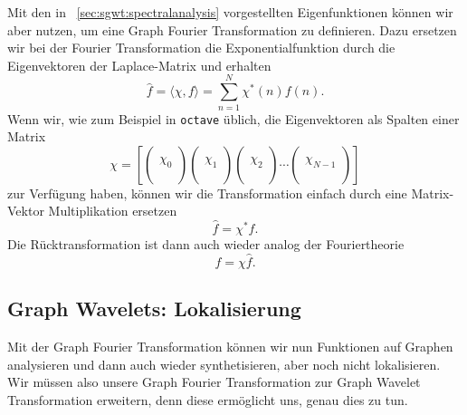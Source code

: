 Mit den in ~\cref{sec:sgwt:spectralanalysis} vorgestellten Eigenfunktionen 
k\"onnen wir aber nutzen, um eine Graph Fourier Transformation zu definieren. 
Dazu ersetzen wir bei der Fourier Transformation die Exponentialfunktion durch 
die Eigenvektoren der Laplace-Matrix und erhalten
\begin{equation*}
\hat{f} = \langle \chi, f \rangle = \sum_{n = 1}^{N} \chi^*(n)f(n).
\end{equation*}
Wenn wir, wie zum Beispiel in \texttt{octave} \"ublich, die Eigenvektoren als 
Spalten einer Matrix
\begin{equation}
\chi = 
\left[
\begin{pmatrix}\\\chi_0\\\\\end{pmatrix}
\begin{pmatrix}\\\chi_1\\\\\end{pmatrix}
\begin{pmatrix}\\\chi_2\\\\\end{pmatrix}
\cdots
\begin{pmatrix}\\\chi_{N-1}\\\\\end{pmatrix}
\right]
\end{equation}
zur Verf\"ugung haben, k\"onnen wir die Transformation 
einfach durch eine Matrix-Vektor Multiplikation ersetzen
\begin{equation*}
\hat{f} = \chi^* f.
\end{equation*}
Die R\"ucktransformation ist dann auch wieder analog der Fouriertheorie
\begin{equation*}
f = \chi \hat{f}.
\end{equation*}

\subsection{Graph Wavelets: Lokalisierung\label{subsec:sgwt:gwt:localizing}}

Mit der Graph Fourier Transformation k\"onnen wir nun Funktionen auf Graphen 
analysieren und dann auch wieder synthetisieren, aber noch nicht 
lokalisieren. Wir m\"ussen also unsere Graph Fourier Transformation zur Graph 
Wavelet Transformation erweitern, denn diese erm\"oglicht uns, genau dies zu 
tun.

